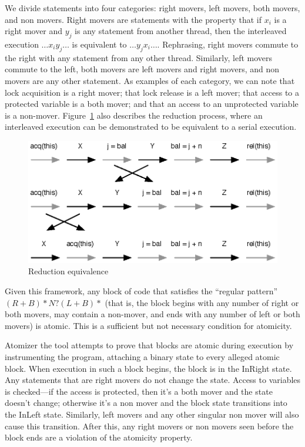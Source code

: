 \documentclass{article}
\begin{document}
\begin{multicols}{2}
We divide statements into four categories: right movers, left movers,
both movers, and non movers.  Right movers are statements with the
property that if $x_i$ is a right mover and $y_j$ is any statement
from another thread, then the interleaved execution $\dots x_i y_j
\dots$ is equivalent to $\dots y_j x_i \dots$.  Rephrasing, right
movers commute to the right with any statement from any other thread.
Similarly, left movers commute to the left, both movers are left
movers and right movers, and non movers are any other statement.  As
examples of each category, we can note that lock acquisition is a
right mover; that lock release is a left mover; that access to a
protected variable is a both mover; and that an access to an
unprotected variable is a non-mover.  Figure~\ref{fig:blockmoving}
also describes the reduction process, where an interleaved execution
can be demonstrated to be equivalent to a serial execution.

\begin{figure}
  \begin{center}
    \leavevmode
    \includegraphics{reduction}
  \end{center}
  \caption{Reduction equivalence}
  \label{fig:blockmoving}
\end{figure}

Given this framework, any block of code that satisfies the ``regular
pattern'' $(R + B)* N? (L + B)*$ (that is, the block begins with any
number of right or both movers, may contain a non-mover, and ends with
any number of left or both movers) is atomic.  This is a sufficient
but not necessary condition for atomicity.

Atomizer the tool attempts to prove that blocks are atomic during
execution by instrumenting the program, attaching a binary state to
every alleged atomic block.  When execution in such a block begins,
the block is in the InRight state.  Any statements that are right
movers do not change the state.  Access to variables is checked---if
the access is protected, then it's a both mover and the state doesn't
change; otherwise it's a non mover and the block state transitions
into the InLeft state.  Similarly, left movers and any other singular
non mover will also cause this transition.  After this, any right
movers or non movers seen before the block ends are a violation of the
atomicity property.


\end{multicols}
\end{document}
